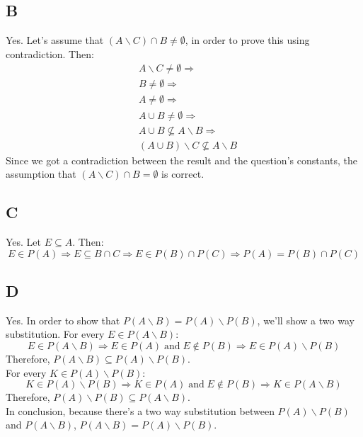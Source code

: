 \documentclass[12pt, oneside]{article}
\begin{document}
\subsection{B}
Yes. Let's assume that $(A \backslash C) \cap B \neq \emptyset$, in order to prove this using contradiction. Then:
\begin{equation*}
\begin{split}
& A \backslash C \neq \emptyset \Rightarrow \\
& B \neq \emptyset \Rightarrow \\
& A \neq \emptyset \Rightarrow \\
& A \cup B \neq \emptyset \Rightarrow \\
& A \cup B \not\subseteq A \backslash B \Rightarrow \\
& (A \cup B) \backslash C \not\subseteq A \backslash B
\end{split}
\end{equation*}
Since we got a contradiction between the result and the question's constants, the assumption that $(A \backslash C) \cap B = \emptyset$ is correct.

\subsection{C}
Yes. Let $E \subseteq A$. Then:
\begin{equation*}
E \in P(A) \Rightarrow E \subseteq B \cap C \Rightarrow E \in P(B) \cap P(C) \Rightarrow P(A) = P(B) \cap P(C)
\end{equation*}

\subsection{D}
Yes. In order to show that $P(A \backslash B) = P(A) \backslash P(B)$, we'll show a two way substitution.
For every $E \in P(A \backslash B)$:
\begin{equation*}
E \in P(A \backslash B) \Rightarrow E \in P(A)\;\text{and}\;E \not\in P(B) \Rightarrow E \in P(A) \backslash P(B)
\end{equation*}
Therefore, $P(A \backslash B) \subseteq P(A) \backslash P(B)$.\\
\hfill\newline
For every $K \in P(A) \backslash P(B)$:
\begin{equation*}
K \in P(A) \backslash P(B) \Rightarrow K \in P(A)\;\text{and}\;E \not\in P(B) \Rightarrow K \in P(A \backslash B)
\end{equation*}
Therefore, $P(A) \backslash P(B) \subseteq P(A \backslash B)$.\\
\hfill\newline
In conclusion, because there's a two way substitution between $P(A) \backslash P(B)$ and $P(A \backslash B)$, $P(A \backslash B) = P(A) \backslash P(B)$.
\clearpage
\end{document}
